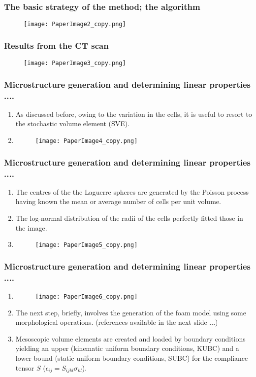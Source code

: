 \documentclass{beamer}
\begin{document}
\begin{frame}
\frametitle{The basic strategy of the method; the algorithm}
\begin{figure}
\texttt{[image: PaperImage2\_copy.png]}
\end{figure}
\end{frame}
\begin{frame}
\frametitle{Results from the CT scan}
\begin{figure}
\texttt{[image: PaperImage3\_copy.png]}
\end{figure}
\end{frame}
\begin{frame}
\frametitle{Microstructure generation and determining linear properties ....}
\begin{enumerate}
	\item As discussed before, owing to the variation in the cells, it is useful to resort to the stochastic volume element (SVE).
	\item
		\begin{figure}
		\texttt{[image: PaperImage4\_copy.png]}
		\end{figure}
\end{enumerate}
\end{frame}
\begin{frame}
\frametitle{Microstructure generation and determining linear properties ....}
\begin{enumerate}
	\item The centres of the the Laguerre spheres are generated by the Poisson process having known the mean or average number of cells per unit volume.
	\item The log-normal distribution of the radii of the cells perfectly fitted those in the image.
	\item
		\begin{figure}
		\texttt{[image: PaperImage5\_copy.png]}
		\end{figure}
\end{enumerate}
\end{frame}
\begin{frame}
\frametitle{Microstructure generation and determining linear properties ....}
\begin{enumerate}
	\item
		\begin{figure}
		\texttt{[image: PaperImage6\_copy.png]}
		\end{figure}
	\item The next step, briefly, involves the generation of the foam model using some morphological operations. (references available in the next slide ...)
	\item Mesoscopic volume elements are created and loaded by boundary conditions yielding an upper (kinematic uniform boundary conditions, KUBC) and a lower bound (static uniform boundary conditions, SUBC) for the compliance tensor $S$ ($\epsilon_{ij} = S_{ijkl} \sigma_{kl}$).
\end{enumerate}
\end{frame}
\end{document}
